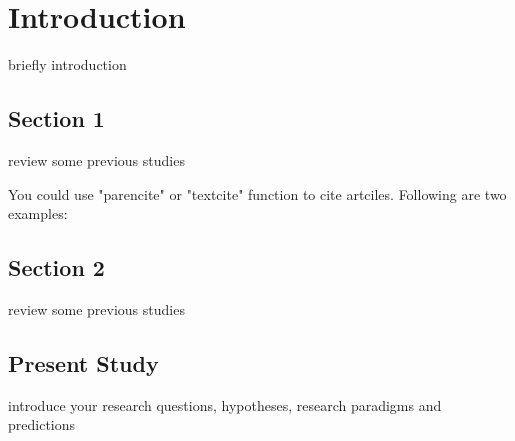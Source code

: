 \section{Introduction}

briefly introduction

\subsection{Section 1}

review some previous studies

You could use "parencite" or "textcite" function to cite artciles. Following are two examples:

\parencite{hauser_social_2019}

\textcite{Efferson2024super}

\subsection{Section 2}

review some previous studies

\subsection{Present Study}

introduce your research questions, hypotheses, research paradigms and predictions